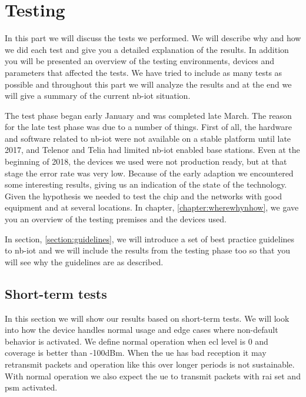 \documentclass[USenglish]{ifimaster}  %
\begin{document}
\chapter{Testing} \label{section:testing}
In this part we will discuss the tests we performed. We will describe why and how we did each test and give you a detailed explanation of the results. In addition you will be presented an overview of the testing environments, devices and parameters that affected the tests. We have tried to include as many tests as possible and throughout this part we will analyze the results and at the end we will give a summary of the current \acrshort{nb-iot} situation.

The test phase began early January and was completed late March. The reason for the late test phase was due to a number of things. First of all, the hardware and software related to \acrshort{nb-iot} were not available on a stable platform until late 2017, and Telenor and Telia had limited \acrshort{nb-iot} enabled base stations. Even at the beginning of 2018, the devices we used were not production ready, but at that stage the error rate was very low. Because of the early adaption we encountered some interesting results, giving us an indication of the state of the technology. Given the hypothesis we needed to test the chip and the networks with good equipment and at several locations. In chapter, \vref{chapter:wherewhynhow}, we gave you an overview of the testing premises and the devices used.

In section, \vref{section:guidelines}, we will introduce a set of best practice guidelines to \acrshort{nb-iot} and we will include the results from the testing phase too so that you will see why the guidelines are as described.

\section{Short-term tests} \label{section:detailedtest}
In this section we will show our results based on short-term tests. We will look into how the device handles normal usage and edge cases where non-default behavior is activated. We define normal operation when \acrshort{ecl} level is 0 and coverage is better than -100dBm. When the \acrshort{ue} has bad reception it may retransmit packets and operation like this over longer periods is not sustainable. With normal operation we also expect the \acrshort{ue} to transmit packets with \acrshort{rai} set and \acrshort{psm} activated.
\end{document}
